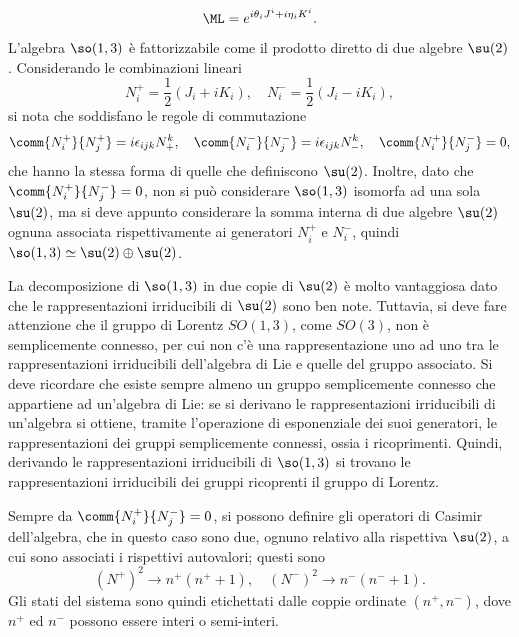 \begin{equation}
    \ML = e^{i\theta_iJ^i + i\eta_iK^i}.
\end{equation}
L'algebra $\so(1,3)$ è fattorizzabile come il prodotto diretto di due algebre $\su(2)$. Considerando le combinazioni lineari
\begin{equation}
\label{eq: comb. lineari Ni+ e Ni-}
    N_i^+ = \frac{1}{2}(J_i + iK_i),\quad N_i^- = \frac{1}{2}(J_i - iK_i),
\end{equation}
si nota che soddisfano le regole di commutazione
\begin{equation}
\label{eq: regole commutazione so(1,3) come su(2) x su(2)}
    \comm{N_i^+}{N_j^+} = i\epsilon_{ijk}N^k_+,\quad\comm{N_i^-}{N_j^-} = i\epsilon_{ijk}N^k_-,\quad\comm{N_i^+}{N_j^-} = 0,
\end{equation}
che hanno la stessa forma di quelle che definiscono $\su(2)$. Inoltre, dato che $\comm{N_i^+}{N_j^-}=0$, non si può considerare $\so(1,3)$ isomorfa ad una sola $\su(2)$, ma si deve appunto considerare la somma interna di due algebre $\su(2)$ ognuna associata rispettivamente ai generatori $N_i^+$ e $N_i^-$, quindi $\so(1,3) \simeq \su(2)\oplus\su(2)$. 
\begin{obs}
    La decomposizione di $\so(1,3)$ in due copie di $\su(2)$ è molto vantaggiosa dato che le rappresentazioni irriducibili di $\su(2)$ sono ben note. Tuttavia, si deve fare attenzione che il gruppo di Lorentz $SO(1,3)$, come $SO(3)$, non è semplicemente connesso, per cui non c'è una rappresentazione uno ad uno tra le rappresentazioni irriducibili dell'algebra di Lie e quelle del gruppo associato. Si deve ricordare che esiste sempre almeno un gruppo semplicemente connesso che appartiene ad un'algebra di Lie: se si derivano le rappresentazioni irriducibili di un'algebra si ottiene, tramite l'operazione di esponenziale dei suoi generatori, le rappresentazioni dei gruppi semplicemente connessi, ossia i ricoprimenti. Quindi, derivando le rappresentazioni irriducibili di $\so(1,3)$ si trovano le rappresentazioni irriducibili dei gruppi ricoprenti il gruppo di Lorentz.
\end{obs}
Sempre da $\comm{N_i^+}{N_j^-}=0$, si possono definire gli operatori di Casimir dell'algebra, che in questo caso sono due, ognuno relativo alla rispettiva $\su(2)$, a cui sono associati i rispettivi autovalori; questi sono
\begin{equation}
\label{eq: operatori di casimir so(1,3)}
    (N^+)^2 \to n^+(n^+ + 1),\quad (N^-)^2 \to n^-(n^- + 1).
\end{equation}
Gli stati del sistema sono quindi etichettati dalle coppie ordinate $(n^+,n^-)$, dove $n^+$ ed $n^-$ possono essere interi o semi-interi. 

